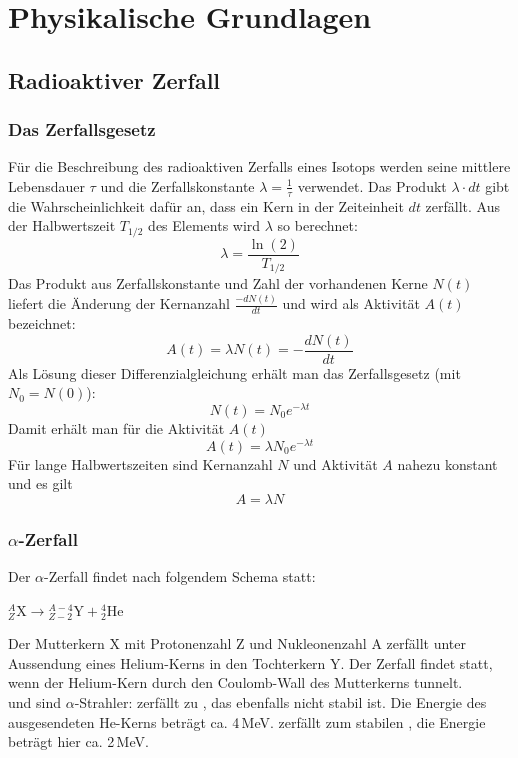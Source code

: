\section{Physikalische Grundlagen}

\subsection{Radioaktiver Zerfall}
\subsubsection{Das Zerfallsgesetz}
Für die Beschreibung des radioaktiven Zerfalls eines Isotops werden seine mittlere Lebensdauer $\tau$ 
und die Zerfallskonstante $\lambda =\frac{1}{\tau}$ verwendet.
Das Produkt $\lambda \cdot dt$ gibt die Wahrscheinlichkeit dafür an, dass ein Kern in der Zeiteinheit $dt$ zerfällt.
Aus der Halbwertszeit $T_{1/2}$ des Elements wird $\lambda$ so berechnet:
\begin{equation}
\label{eq:lambdahwz}
	\lambda=\frac{\ln (2)}{T_{1/2}}
\end{equation}
Das Produkt aus Zerfallskonstante und Zahl der vorhandenen Kerne $N(t)$ liefert die
Änderung der Kernanzahl $\frac{-d N(t)}{dt}$ und wird als Aktivität $A(t)$ bezeichnet:
\begin{equation}
	A(t)=\lambda N(t)= -\frac{d N(t)}{dt}
\end{equation}
Als Lösung dieser Differenzialgleichung erhält man das Zerfallsgesetz (mit $N_0 = N(0)$):
\begin{equation}
	N(t)=N_0 e^{-\lambda t}
\end{equation}
Damit erhält man für die Aktivität $A(t)$
\begin{equation}
	A(t)=\lambda N_0 e^{-\lambda t}
\end{equation}
Für lange Halbwertszeiten sind Kernanzahl $N$ und Aktivität $A$ nahezu konstant und es gilt
\begin{equation}
\label{eq:aln}
	A=\lambda N
\end{equation}

\subsubsection{$\alpha$-Zerfall}
Der $\alpha$-Zerfall findet nach folgendem Schema statt:
\begin{center}
${}^{A}_{Z}\text{X} \rightarrow {}^{A-4}_{Z-2}\text{Y} + {}^{4}_{2}\text{He}$
\end{center}
Der Mutterkern X mit Protonenzahl Z und Nukleonenzahl A zerfällt unter Aussendung eines Helium-Kerns
in den Tochterkern Y.
Der Zerfall findet statt, wenn der Helium-Kern durch den Coulomb-Wall des Mutterkerns tunnelt.\\
 und  sind $\alpha$-Strahler:
 zerfällt zu , das ebenfalls nicht stabil ist.
Die Energie des ausgesendeten He-Kerns beträgt ca. 4\,MeV.
 zerfällt zum stabilen , die Energie beträgt hier ca. 2\,MeV.

